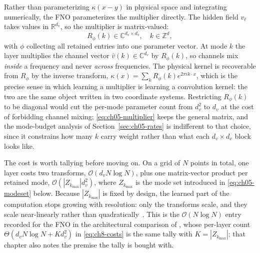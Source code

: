 Rather than parameterizing $\kappa(x-y)$ in physical space and integrating
numerically, the FNO parameterizes the multiplier directly. The hidden field
$v_\ell$ takes values in $\mathbb{R}^{d_v}$, so the multiplier is
matrix-valued:
\begin{equation}
  \label{eq:ch05-multiplier}
  R_\phi(k) \in \mathbb{C}^{d_v \times d_v}, \quad k \in \mathbb{Z}^d,
\end{equation}
with $\phi$ collecting all retained entries into one parameter vector. At mode
$k$ the layer multiplies the channel vector $\hat{v}(k) \in \mathbb{C}^{d_v}$ by
$R_\phi(k)$, so channels mix \emph{inside} a frequency and never \emph{across}
frequencies. The physical kernel is recoverable from
$R_\phi$ by the inverse transform,
$\kappa(x) = \sum_{k} R_\phi(k) e^{2\pi i k \cdot x}$, which is the precise
sense in which learning a multiplier is learning a convolution kernel: the two
are the same object written in two coordinate systems. Restricting
$R_\phi(k)$ to be diagonal would cut the per-mode parameter count from $d_v^2$
to $d_v$ at the cost of forbidding channel mixing; \eqref{eq:ch05-multiplier}
keeps the general matrix, and the mode-budget analysis of
Section~\ref{sec:ch05-rates} is indifferent to that choice, since it constrains
how many $k$ carry weight rather than what each $d_v \times d_v$ block looks
like.

The cost is worth tallying before moving on. On a grid of $N$ points in total,
one layer costs two transforms, $\mathcal{O}(d_v N \log N)$, plus one
matrix-vector product per retained mode, $\mathcal{O}(|Z_{k_{\max}}| d_v^2)$,
where $Z_{k_{\max}}$ is the mode set introduced in \eqref{eq:ch05-modeset}
below. Because $|Z_{k_{\max}}|$ is fixed by design, the learned part of the
computation stops growing with resolution: only the transforms scale, and they
scale near-linearly rather than quadratically~\cite{kovachki2023neural}. This
is the $\mathcal{O}(N \log N)$ entry recorded for the FNO in the architectural
comparison of ,
whose per-layer count $\Theta(d_v N \log N + K d_v^{2})$ in
\eqref{eq:ch8-costs} is the same tally with $K = |Z_{k_{\max}}|$; that chapter
also notes the premise the tally is bought with.

